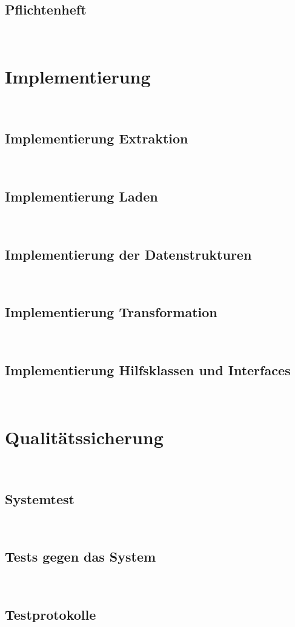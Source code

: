 \documentclass[11pt,toc=sectionentrywithoutdots, headheight=44pt, headings=optiontoheadandtoc]{scrartcl}
\begin{document}
\subsection{Pflichtenheft}
\blindtext\

\section{Implementierung}
\blindtext\

\subsection{Implementierung Extraktion}
\blindtext\

\subsection{Implementierung Laden}
\blindtext\

\subsection{Implementierung der Datenstrukturen}
\blindtext\

\subsection{Implementierung Transformation}
\blindtext\

\subsection{Implementierung Hilfsklassen und Interfaces}
\blindtext\

\section{Qualitätssicherung}
\blindtext\

\subsection{Systemtest}
\blindtext\

\subsection{Tests gegen das System}
\blindtext\

\subsection{Testprotokolle}
\blindtext\
\end{document}
